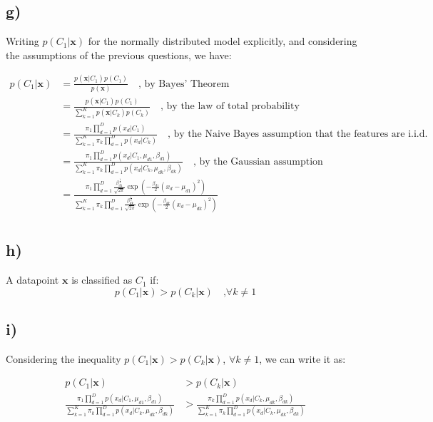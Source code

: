 \documentclass[12pt,a4paper,oneside]{paper}
\begin{document}
\newpage
\subsection*{g)}

Writing $p(C_1 | \bm{x})$ for the normally distributed model explicitly, and considering the assumptions of the previous questions, we have:

\begin{align*}
    p(C_1 | \bm{x}) &= \frac{p(\bm{x} | C_1) p(C_1)}{p(\bm{x})} \quad \text{, by Bayes' Theorem} \\
    &= \frac{p(\bm{x} | C_1) p(C_1)}{\sum_{k=1}^{K} p(\bm{x} | C_k) p(C_k)} \quad \text{, by the law of total probability} \\
    &= \frac{\pi_1 \prod_{d=1}^{D} p(x_d | C_1)}{\sum_{k=1}^{K} \pi_k \prod_{d=1}^{D} p(x_d | C_k)} \quad \text{, by the Naive Bayes assumption that the features are i.i.d.} \\
    &= \frac{\pi_1 \prod_{d=1}^{D} p(x_d | C_1, \mu_{d1}, \beta_{d1})}{\sum_{k=1}^{K} \pi_k \prod_{d=1}^{D} p(x_d | C_k, \mu_{dk}, \beta_{dk})} \quad \text{, by the Gaussian assumption} \\
    &= \frac{\pi_1 \prod_{d=1}^{D} \frac{\beta_{d1}^{\frac{1}{2}}}{\sqrt{2\pi}} \exp\left(-\frac{\beta_{d1}}{2} (x_d - \mu_{d1})^2\right)}{\sum_{k=1}^{K} \pi_k \prod_{d=1}^{D} \frac{\beta_{dk}^{\frac{1}{2}}}{\sqrt{2\pi}} \exp\left(-\frac{\beta_{dk}}{2} (x_d - \mu_{dk})^2\right)} \\
\end{align*}

\newpage
\subsection*{h)}

A datapoint $\bm{x}$ is classified as $C_1$ if: 
$$
p(C_1 | \bm{x}) > p(C_k | \bm{x}) \quad \text{,}\forall k \neq 1
$$

\newpage
\subsection*{i)}

Considering the inequality $p(C_1 | \bm{x}) > p(C_k | \bm{x})$, $\forall k \neq 1$, we can write it as:

\begin{align*}
    p(C_1 | \bm{x}) &> p(C_k | \bm{x}) \\
    \frac{\pi_1 \prod_{d=1}^{D} p(x_d | C_1, \mu_{d1}, \beta_{d1})}{\sum_{k=1}^{K} \pi_k \prod_{d=1}^{D} p(x_d | C_k, \mu_{dk}, \beta_{dk})} &> \frac{\pi_k \prod_{d=1}^{D} p(x_d | C_k, \mu_{dk}, \beta_{dk})}{\sum_{k=1}^{K} \pi_k \prod_{d=1}^{D} p(x_d | C_k, \mu_{dk}, \beta_{dk})} \\
\end{align*}
\end{document}
